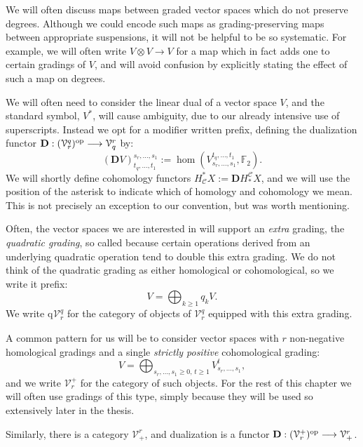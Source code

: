 \documentclass[11pt]{amsart} \renewcommand{\baselinestretch}{1.2}
\theoremstyle{plain}
\numberwithin{equation}{section} %
\theoremstyle{plain}
\numberwithin{equation}{chapter} %
\renewcommand{\to}{\longrightarrow}
\newcommand{\calV}{\mathcal{V}}
\newcommand{\calc}{\mathcal{C}}
\newcommand{\vect}[2]{\calV^{#1}_{#2}}
\newcommand{\quadgrad}[1]{\mathrm{q}_{#1}}
\newcommand{\F}{\mathbb{F}}
\newcommand{\Ftwo}{\F_2}
\newcommand{\dual}{\mathbf{D}}
\begin{document}
\begin{Conventions and notation}
We will often discuss maps between graded vector spaces which do not preserve degrees. %
Although we could encode such maps as grading-preserving maps between appropriate suspensions, it will not be helpful to be so systematic. For example, we will often write $V\otimes V\to V$ for a map which in fact adds one to certain gradings of $V$, and will avoid confusion by explicitly stating the effect of such a map on degrees.

We will often need to consider the linear dual of a vector space $V$, and the standard symbol, $V^*$, will cause ambiguity, due to our already intensive use of superscripts. Instead we opt for a modifier written prefix, defining the dualization functor
$\dual:(\vect{q}{r})^\textup{op}\to\vect{r}{q}$ by:
\[(\dual V)_{t_q,\ldots,t_1}^{s_r,\ldots,s_1}:=\hom(V^{t_q,\ldots,t_1}_{s_r,\ldots,s_1},\Ftwo ).\]
We will shortly define cohomology functors
$H_{\calc}^*X:=\dual H^{\calc}_*X$, and we will use the position of the asterisk to indicate which of homology and cohomology we mean. This is not precisely an exception to our convention, but was worth mentioning.

Often, the vector spaces we are interested in will support an \emph{extra} grading, the \emph{quadratic grading}, so called because certain operations derived from an underlying quadratic operation tend to double this extra grading. We do not think of the quadratic grading as either homological or cohomological, so we write it prefix:
\[V=\textstyle\bigoplus_{k\geq1}q_kV.\]
We write $\quadgrad{}\vect{q}{r}$ for the category of objects of $\vect{q}{r}$ equipped with this extra grading.

A common pattern for us will be to consider vector spaces with $r$ non-negative homological gradings and a single \emph{strictly positive} cohomological grading:
\[V=\bigoplus_{s_r,\ldots,s_1\geq0,\,t\geq 1}V^{t}_{s_r,\ldots,s_1},\]
and we write $\vect{+}{r}$ for the category of such objects. For the rest of this chapter we will often use gradings of this type, simply because they will be used so extensively later in the thesis.

Similarly, there is a category $\vect{r}{+}$, and  dualization is a functor $\dual:(\vect{+}{r})^\textup{op}\to\vect{r}{+}$.



\end{Conventions and notation}
\end{document}
